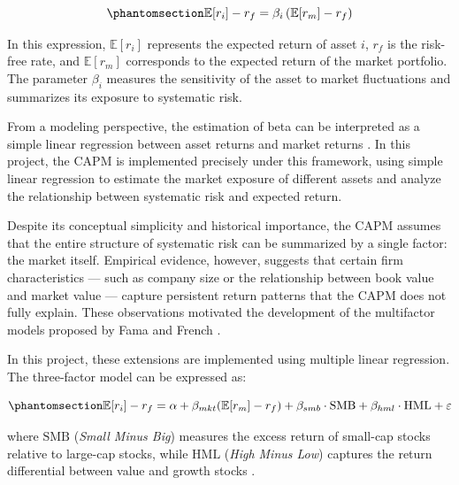 \documentclass[
  12pt,
  letterpaper,
]{book}
\begin{document}
\begin{equation}\phantomsection\label{eq-capm}{
\mathbb{E}[r_i] - r_f = \beta_i \left( \mathbb{E}[r_m] - r_f \right)
}\end{equation}

In this expression, \(\mathbb{E}[r_i]\) represents the expected return
of asset \(i\), \(r_f\) is the risk-free rate, and \(\mathbb{E}[r_m]\)
corresponds to the expected return of the market portfolio. The
parameter \(\beta_i\) measures the sensitivity of the asset to market
fluctuations and summarizes its exposure to systematic risk.

From a modeling perspective, the estimation of beta can be interpreted
as a simple linear regression between asset returns and market returns
. In this project, the CAPM
is implemented precisely under this framework, using simple linear
regression to estimate the market exposure of different assets and
analyze the relationship between systematic risk and expected return.

Despite its conceptual simplicity and historical importance, the CAPM
assumes that the entire structure of systematic risk can be summarized
by a single factor: the market itself. Empirical evidence, however,
suggests that certain firm characteristics --- such as company size or
the relationship between book value and market value --- capture
persistent return patterns that the CAPM does not fully explain. These
observations motivated the development of the multifactor models
proposed by Fama and French 
.

In this project, these extensions are implemented using multiple linear
regression. The three-factor model can be expressed as:

\begin{equation}\phantomsection\label{eq-fama-french-3factor}{
\mathbb{E}[r_i] - r_f = \alpha + \beta_{mkt} (\mathbb{E}[r_m] - r_f) + \beta_{smb} \cdot \text{SMB} + \beta_{hml} \cdot \text{HML} + \varepsilon
}\end{equation}

where \(\text{SMB}\) (\emph{Small Minus Big}) measures the excess return
of small-cap stocks relative to large-cap stocks, while \(\text{HML}\)
(\emph{High Minus Low}) captures the return differential between value
and growth stocks 
.
\end{document}
